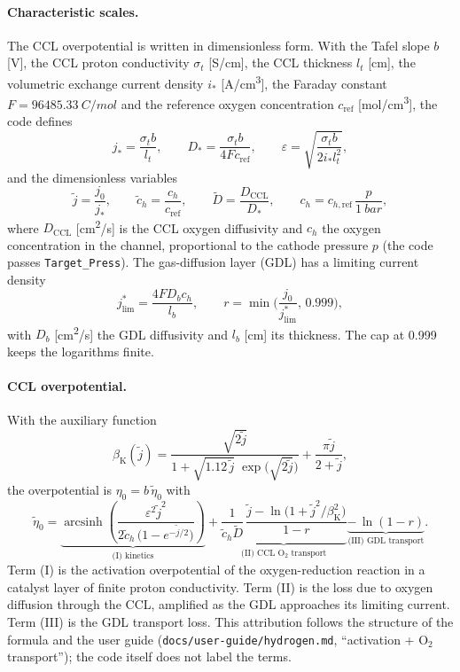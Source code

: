\documentclass[a4paper,11pt]{article}
\newcommand{\code}[1]{\nolinkurl{#1}}
\newcommand{\fn}[1]{\nolinkurl{#1}}
\begin{document}
\paragraph{Characteristic scales.} The CCL overpotential is written in dimensionless form.
With the Tafel slope $b$ [V], the CCL proton conductivity $\sigma_t$ [S/cm], the CCL
thickness $l_t$ [cm], the volumetric exchange current density $i_*$ [\si{A/cm^3}], the
Faraday constant $F=\SI{96485.33}{C/mol}$ and the reference oxygen concentration
$c_\mathrm{ref}$ [\si{mol/cm^3}], the code defines
\begin{equation}
  j_* = \frac{\sigma_t b}{l_t}, \qquad
  D_* = \frac{\sigma_t b}{4 F c_\mathrm{ref}}, \qquad
  \varepsilon = \sqrt{\frac{\sigma_t b}{2 i_* l_t^2}} ,
\end{equation}
and the dimensionless variables
\begin{equation}
  \tilde j = \frac{j_0}{j_*}, \qquad
  \tilde c_h = \frac{c_h}{c_\mathrm{ref}}, \qquad
  \tilde D = \frac{D_\mathrm{CCL}}{D_*}, \qquad
  c_h = c_{h,\mathrm{ref}}\,\frac{p}{\SI{1}{bar}} ,
\end{equation}
where $D_\mathrm{CCL}$ [\si{cm^2/s}] is the CCL oxygen diffusivity and $c_h$ the oxygen
concentration in the channel, proportional to the cathode pressure $p$ (the code passes
\code{Target_Press}). The gas-diffusion layer (GDL) has a limiting current density
\begin{equation}
  j_\mathrm{lim}^{*} = \frac{4 F D_b c_h}{l_b}, \qquad
  r = \min\!\Big(\frac{j_0}{j^*_\mathrm{lim}},\, 0.999\Big),
\end{equation}
with $D_b$ [\si{cm^2/s}] the GDL diffusivity and $l_b$ [cm] its thickness. The cap at 0.999
keeps the logarithms finite.

\paragraph{CCL overpotential.} With the auxiliary function
\begin{equation}
  \beta_\mathrm{K}(\tilde j) = \frac{\sqrt{2\tilde j}}{1+\sqrt{1.12\,\tilde j}\;\exp\!\big(\sqrt{2\tilde j}\big)}
  + \frac{\pi \tilde j}{2+\tilde j},
\end{equation}
the overpotential is $\eta_0 = b\,\tilde\eta_0$ with
\begin{equation}
  \tilde\eta_0 =
  \underbrace{\operatorname{arcsinh}\!\left(\frac{\varepsilon^2\tilde j^2}
      {2\tilde c_h\,\big(1-e^{-\tilde j/2}\big)}\right)}_{\text{(I) kinetics}}
  + \underbrace{\frac{1}{\tilde c_h \tilde D}\,
      \frac{\tilde j - \ln\!\big(1+\tilde j^2/\beta_\mathrm{K}^2\big)}{1-r}}_{\text{(II) CCL O$_2$ transport}}
  \underbrace{-\,\ln(1-r)}_{\text{(III) GDL transport}} .
  \label{eq:eta0}
\end{equation}
Term (I) is the activation overpotential of the oxygen-reduction reaction in a catalyst layer
of finite proton conductivity. Term (II) is the loss due to oxygen diffusion through the CCL,
amplified as the GDL approaches its limiting current. Term (III) is the GDL transport loss.
This attribution follows the structure of the formula and the user guide
(\fn{docs/user-guide/hydrogen.md}, ``activation + O$_2$ transport''); the code itself does not
label the terms.
\end{document}

